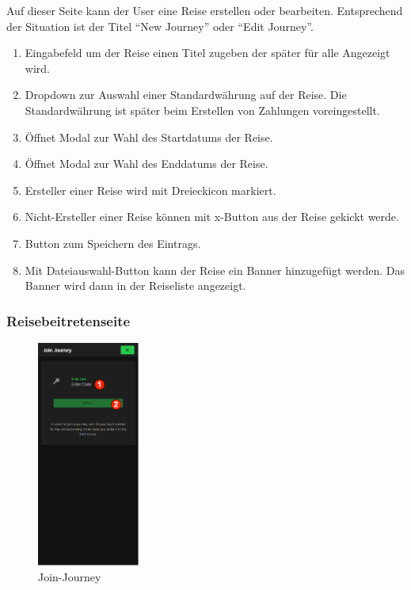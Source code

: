 Auf dieser Seite kann der User eine Reise erstellen oder bearbeiten. Entsprechend der Situation ist der Titel  "`New Journey"' oder "`Edit Journey"'.

\begin{enumerate}[label=\protect\circled{\arabic*}]
	\item Eingabefeld um der Reise einen Titel zugeben der später für alle Angezeigt wird.
	\item Dropdown zur Auswahl einer Standardwährung auf der Reise.
	      Die Standardwährung ist später beim Erstellen von Zahlungen voreingestellt.
	\item Öffnet Modal zur Wahl des Startdatums der Reise.
	\item Öffnet Modal zur Wahl des Enddatums der Reise.
	\item Ersteller einer Reise wird mit Dreieckicon markiert.
	\item Nicht-Ersteller einer Reise können mit x-Button aus der Reise gekickt werde.
	\item Button zum Speichern des Eintrags.
	\item Mit Dateiauswahl-Button kann der Reise ein Banner hinzugefügt werden. Das Banner wird dann in der Reiseliste angezeigt.
\end{enumerate}

\subsubsection{Reisebeitretenseite}\label{Reisebeitretenseite}
\begin{figure}[H]
	\centering
	\includegraphics[width=0.3\textwidth]{img/pages_numbers/join-journey.drawio}
	\caption[Join-Journey]{Join-Journey}
	\label{fig:Join-Journey}
\end{figure}

